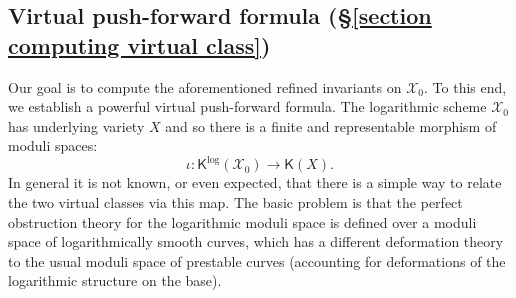 \documentclass[11pt]{amsart}
\theoremstyle{definition}
\theoremstyle{definition}
\newcommand{\Xcal}{\mathcal{X}}
\newcommand{\Kup}{\mathsf{K}}
\begin{document}
\subsection{Virtual push-forward formula (\S \ref{section computing virtual class})} Our goal is to compute the aforementioned refined invariants on $\Xcal_0$. To this end, we establish a powerful virtual push-forward formula. The logarithmic scheme $\Xcal_0$ has underlying variety $X$ and so there is a finite and representable morphism of moduli spaces:
\begin{equation*} \iota \colon \Kup^{\log}(\Xcal_0) \to \Kup(X).\end{equation*}
In general it is not known, or even expected, that there is a simple way to relate the two virtual classes via this map. The basic problem is that the perfect obstruction theory for the logarithmic moduli space is defined over a moduli space of logarithmically smooth curves, which has a different deformation theory to the usual moduli space of prestable curves (accounting for deformations of the logarithmic structure on the base).
\end{document}
